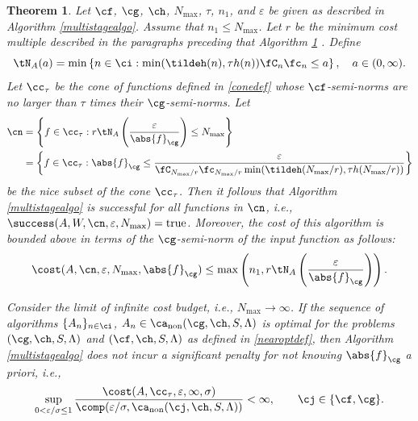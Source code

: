 \documentclass[]{elsarticle}
\DeclareMathOperator{\fix}{non}
\newtheorem{theorem}{Theorem}
\theoremstyle{definition}
\theoremstyle{remark}
\newcommand{\Gnorm}[1]{\abs{#1}_{\cg}}
\begin{document}
\begin{theorem}  \label{MultiStageThm}  Let  $\cf$, $\cg$, $\ch$, $N_{\max}$, $\tau$, $n_1$, and $\varepsilon$ be given as described in Algorithm \ref{multistagealgo}. Assume that $n_1 \le N_{\max}$. Let $r$ be the minimum cost multiple described in the paragraphs preceding that Algorithm \ref{MultiStageThm} .  Define 
\begin{equation} \label{tNmindef}
\tN_A(a) = \min\left\{ n \in \ci : \min(\tildeh(n),\tau h(n))\fC_n\fc_n \le a \right\}, \quad a \in (0,\infty).
\end{equation}
Let $\cc_\tau$ be the cone of functions defined in \eqref{conedef} whose $\cf$-semi-norms are no larger than $\tau$ times their $\cg$-semi-norms.  Let
\begin{align} 
\nonumber
\cn &= \left \{ f \in \cc_\tau :r\tN_{A}\left(\frac{\varepsilon}{\Gnorm{f}} \right) \le N_{\max} \right\} \\
\label{nicefdefmulti}
&= \left \{ f \in \cc_\tau : \Gnorm{f} \le \frac{\varepsilon}{\fC_{N_{\max}/r} \fc_{N_{\max}/r} \min(\tildeh(N_{\max}/r),\tau h(N_{\max}/r))} \right\}
\end{align}
be the nice subset of the cone $\cc_\tau$.  Then it follows that Algorithm \ref{multistagealgo} is successful for all functions in $\cn$,  i.e.,  $\success(A,W,\cn,\varepsilon,N_{\max}) = \text{true}$.  Moreover, the cost of this algorithm is bounded above in terms of the $\cg$-semi-norm of the input function as follows:
\begin{equation} \label{automultistagedetcost}
\cost(A,\cn,\varepsilon,N_{\max},\Gnorm{f})
\le \max \left(n_1, r\tN_{A}\left(\frac{\varepsilon}{\Gnorm{f}} \right) \right).
\end{equation}

Consider the limit of infinite cost budget, i.e., $N_{\max} \to \infty$.  If the sequence of algorithms $\{A_n\}_{n \in \ci}$, $A_n \in\ca_{\fix}(\cg,\ch,S,\Lambda)$  is optimal for the problems $(\cg,\ch,S,\Lambda)$ and $(\cf,\ch,S,\Lambda)$ as defined in \eqref{nearoptdef}, then Algorithm \ref{multistagealgo} does not incur a significant penalty for not knowing $\Gnorm{f}$ a priori, i.e.,
\begin{equation*} \label{multistagepenalty}
\sup_{0 < \varepsilon/\sigma \le 1} \frac{\cost(A,\cc_{\tau},\varepsilon,\infty,\sigma)} {\comp(\varepsilon/\sigma,\ca_{\fix}(\cj,\ch,S,\Lambda))} <\infty, \qquad \cj \in \{\cf,\cg\}.
\end{equation*}
\end{theorem}
\end{document}
